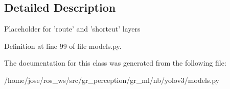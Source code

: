 \subsection{Detailed Description}
\begin{DoxyVerb}Placeholder for 'route' and 'shortcut' layers\end{DoxyVerb}
 

Definition at line 99 of file models.\+py.



The documentation for this class was generated from the following file\+:\begin{DoxyCompactItemize}
\item 
/home/jose/ros\+\_\+ws/src/gr\+\_\+perception/gr\+\_\+ml/nb/yolov3/models.\+py\end{DoxyCompactItemize}
